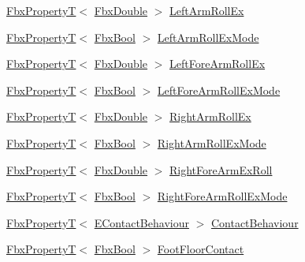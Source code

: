 \begin{DoxyCompactItemize}
\item 
\hyperlink{class_fbx_property_t}{Fbx\+PropertyT}$<$ \hyperlink{fbxtypes_8h_a171e72a1c46fc15c1a6c9c31948c1c5b}{Fbx\+Double} $>$ \hyperlink{class_fbx_character_a0ba6477859cfe4d8cf40ad25d0ad77f9}{Left\+Arm\+Roll\+Ex}
\item 
\hyperlink{class_fbx_property_t}{Fbx\+PropertyT}$<$ \hyperlink{fbxtypes_8h_a92e0562b2fe33e76a242f498b362262e}{Fbx\+Bool} $>$ \hyperlink{class_fbx_character_a0179aa02e908bbddb1c8c3d2af572e7e}{Left\+Arm\+Roll\+Ex\+Mode}
\item 
\hyperlink{class_fbx_property_t}{Fbx\+PropertyT}$<$ \hyperlink{fbxtypes_8h_a171e72a1c46fc15c1a6c9c31948c1c5b}{Fbx\+Double} $>$ \hyperlink{class_fbx_character_a7160d66b2069f56e1620c571f3f5d06d}{Left\+Fore\+Arm\+Roll\+Ex}
\item 
\hyperlink{class_fbx_property_t}{Fbx\+PropertyT}$<$ \hyperlink{fbxtypes_8h_a92e0562b2fe33e76a242f498b362262e}{Fbx\+Bool} $>$ \hyperlink{class_fbx_character_aa3b309652cc8107ccee581696ab43273}{Left\+Fore\+Arm\+Roll\+Ex\+Mode}
\item 
\hyperlink{class_fbx_property_t}{Fbx\+PropertyT}$<$ \hyperlink{fbxtypes_8h_a171e72a1c46fc15c1a6c9c31948c1c5b}{Fbx\+Double} $>$ \hyperlink{class_fbx_character_a3415bca86b55c4fdf841d452c562e6d0}{Right\+Arm\+Roll\+Ex}
\item 
\hyperlink{class_fbx_property_t}{Fbx\+PropertyT}$<$ \hyperlink{fbxtypes_8h_a92e0562b2fe33e76a242f498b362262e}{Fbx\+Bool} $>$ \hyperlink{class_fbx_character_a3d259881290565268c78fc38e96a7472}{Right\+Arm\+Roll\+Ex\+Mode}
\item 
\hyperlink{class_fbx_property_t}{Fbx\+PropertyT}$<$ \hyperlink{fbxtypes_8h_a171e72a1c46fc15c1a6c9c31948c1c5b}{Fbx\+Double} $>$ \hyperlink{class_fbx_character_a7731e04aecc975db137165f0770a48b5}{Right\+Fore\+Arm\+Ex\+Roll}
\item 
\hyperlink{class_fbx_property_t}{Fbx\+PropertyT}$<$ \hyperlink{fbxtypes_8h_a92e0562b2fe33e76a242f498b362262e}{Fbx\+Bool} $>$ \hyperlink{class_fbx_character_a49775ba6e1428e6be008feeeed7cc516}{Right\+Fore\+Arm\+Roll\+Ex\+Mode}
\item 
\hyperlink{class_fbx_property_t}{Fbx\+PropertyT}$<$ \hyperlink{class_fbx_character_a44b6e7961224e21a78dbf91295e480fc}{E\+Contact\+Behaviour} $>$ \hyperlink{class_fbx_character_a7fa2029676264df553457d41f5e4461b}{Contact\+Behaviour}
\item 
\hyperlink{class_fbx_property_t}{Fbx\+PropertyT}$<$ \hyperlink{fbxtypes_8h_a92e0562b2fe33e76a242f498b362262e}{Fbx\+Bool} $>$ \hyperlink{class_fbx_character_a706b4efffc81b093dcb2d9118a1cdb6b}{Foot\+Floor\+Contact}

\end{DoxyCompactItemize}
